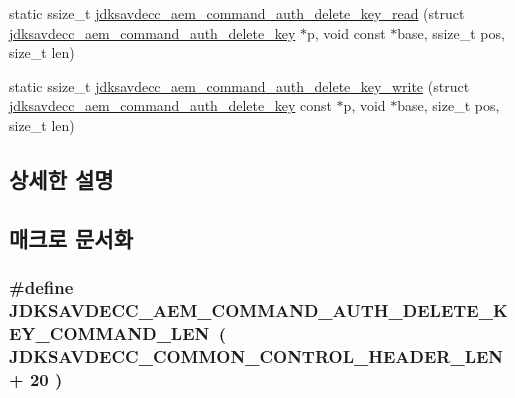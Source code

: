 \begin{DoxyCompactItemize}
\item 
static ssize\+\_\+t \hyperlink{group__command__auth__delete__key_ga573cc7b5fecd00a5890876ecfc51ed6a}{jdksavdecc\+\_\+aem\+\_\+command\+\_\+auth\+\_\+delete\+\_\+key\+\_\+read} (struct \hyperlink{structjdksavdecc__aem__command__auth__delete__key}{jdksavdecc\+\_\+aem\+\_\+command\+\_\+auth\+\_\+delete\+\_\+key} $\ast$p, void const $\ast$base, ssize\+\_\+t pos, size\+\_\+t len)
\item 
static ssize\+\_\+t \hyperlink{group__command__auth__delete__key_gae945dc8dfe33845ec2846393fe9fb801}{jdksavdecc\+\_\+aem\+\_\+command\+\_\+auth\+\_\+delete\+\_\+key\+\_\+write} (struct \hyperlink{structjdksavdecc__aem__command__auth__delete__key}{jdksavdecc\+\_\+aem\+\_\+command\+\_\+auth\+\_\+delete\+\_\+key} const $\ast$p, void $\ast$base, size\+\_\+t pos, size\+\_\+t len)
\end{DoxyCompactItemize}


\subsection{상세한 설명}


\subsection{매크로 문서화}
\subsubsection[{\texorpdfstring{J\+D\+K\+S\+A\+V\+D\+E\+C\+C\+\_\+\+A\+E\+M\+\_\+\+C\+O\+M\+M\+A\+N\+D\+\_\+\+A\+U\+T\+H\+\_\+\+D\+E\+L\+E\+T\+E\+\_\+\+K\+E\+Y\+\_\+\+C\+O\+M\+M\+A\+N\+D\+\_\+\+L\+EN}{JDKSAVDECC_AEM_COMMAND_AUTH_DELETE_KEY_COMMAND_LEN}}]{\setlength{\rightskip}{0pt plus 5cm}\#define J\+D\+K\+S\+A\+V\+D\+E\+C\+C\+\_\+\+A\+E\+M\+\_\+\+C\+O\+M\+M\+A\+N\+D\+\_\+\+A\+U\+T\+H\+\_\+\+D\+E\+L\+E\+T\+E\+\_\+\+K\+E\+Y\+\_\+\+C\+O\+M\+M\+A\+N\+D\+\_\+\+L\+EN~( {\bf J\+D\+K\+S\+A\+V\+D\+E\+C\+C\+\_\+\+C\+O\+M\+M\+O\+N\+\_\+\+C\+O\+N\+T\+R\+O\+L\+\_\+\+H\+E\+A\+D\+E\+R\+\_\+\+L\+EN} + 20 )}\hypertarget{group__command__auth__delete__key_gac6d4d2fa0239845c45512103ef2efa1c}{}\label{group__command__auth__delete__key_gac6d4d2fa0239845c45512103ef2efa1c}


